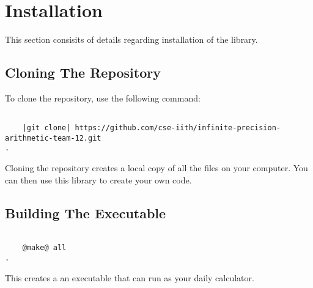 



\section{Installation}
This section consisits of details regarding installation of the library.
\subsection{Cloning The Repository}
To clone the repository, use the following command:
\begin{lstlisting}[style=terminal]

	|git clone| https://github.com/cse-iith/infinite-precision-arithmetic-team-12.git
.
\end{lstlisting}
Cloning the repository creates a local copy of all the files on your computer. You can then use this library to create your own code.

\subsection{Building The Executable}
\begin{lstlisting}[style=terminal]

	@make@ all
.
\end{lstlisting}
This creates a an executable that can run as your daily calculator.

